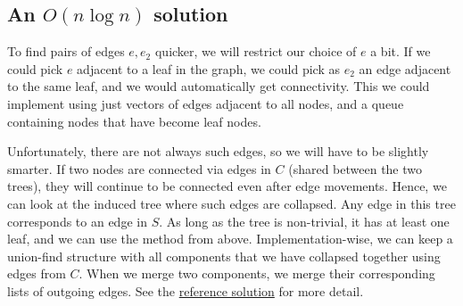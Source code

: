 \documentclass{article}
\begin{document}
\subsection*{An $O(n \log n)$ solution}
To find pairs of edges $e, e_2$ quicker, we will restrict our choice of $e$ a bit.
If we could pick $e$ adjacent to a leaf in the graph, we could pick as $e_2$ an edge adjacent to the same leaf,
and we would automatically get connectivity.
This we could implement using just vectors of edges adjacent to all nodes, and a queue containing nodes that have become leaf nodes.

Unfortunately, there are not always such edges, so we will have to be slightly smarter.
If two nodes are connected via edges in $C$ (shared between the two trees), they will continue to be connected even after
edge movements. Hence, we can look at the induced tree where such edges are collapsed.
Any edge in this tree corresponds to an edge in $S$. As long as the tree is non-trivial, it has at least one leaf, and we can use the method from above.
Implementation-wise, we can keep a union-find structure with all components that we have collapsed together using edges from $C$.
When we merge two components, we merge their corresponding lists of outgoing edges. See the \href{https://gist.github.com/simonlindholm/7a41d3bf99f7ab278a4a15ce87e960b4}{reference solution} for more detail.
\end{document}
